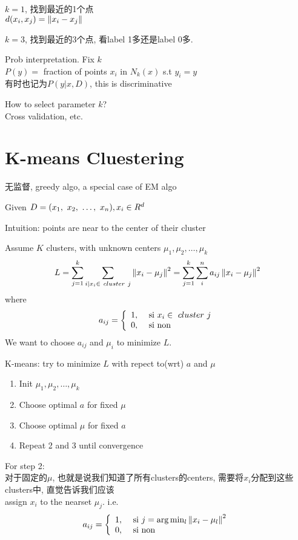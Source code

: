 \documentclass{article}
\begin{document}
\begin{itemize}
\begin{itemize}
$k=1$, 找到最近的1个点\\
$d(x_i, x_j) = \left\Vert x_i - x_j\right\Vert$

$k=3$, 找到最近的3个点, 看label 1多还是label 0多.

Prob interpretation. Fix $k$\\
$P(y) =$ fraction of points $x_i$ in $N_k(x)$ s.t $y_i = y$\\
有时也记为$P(y|x, D)$, this is discriminative

How to select parameter $k$?\\
Cross validation, etc.

\section{K-means Cluestering}
无监督, greedy algo, a special case of EM algo

Given $D = (x_1,~x_2,~\ldots,~x_n), x_i \in R^d$

Intuition: points are near to the center of their cluster

Assume $K$ clusters, with unknown centers $\mu_1, \mu_2, \ldots, \mu_k$
$$
L
= \sum_{j = 1}^k \sum_{i | x_i \in\ cluster\ j}\left\Vert x_i - \mu_j\right\Vert^2
= \sum_{j = 1}^k \sum_i^n a_{ij}\left\Vert x_i - \mu_j\right\Vert^2
$$
where 
$$
a_{ij} =
\left\{
  \begin{array}{ll}
    1, & \textrm{ si } x_i \in\ cluster\ j\\
    0, & \textrm{ si non}
  \end{array}
\right.
$$
We want to choose $a_{ij}$ and $\mu_i$ to minimize $L$.

K-means: try to minimize $L$ with repect to(wrt) $a$ and $\mu$
\begin{enumerate}
\item Init $\mu_1, \mu_2, \ldots, \mu_k$
\item Choose optimal $a$ for fixed $\mu$
\item Choose optimal $\mu$ for fixed $a$
\item Repeat 2 and 3 until convergence
\end{enumerate}

For step 2:\\
对于固定的$\mu$, 也就是说我们知道了所有clusters的centers, 需要将$x_i$分配到这些clusters中, 直觉告诉我们应该\\
assign $x_i$ to the nearset $\mu_j$. i.e.
$$
a_{ij} =
\left\{
  \begin{array}{ll}
  1, & \textrm{ si } j = \arg \min_l \left\Vert x_i - \mu_l\right\Vert^2\\
    0, & \textrm{ si non}
  \end{array}
\right.
$$


\end{itemize}
\end{itemize}
\end{document}
